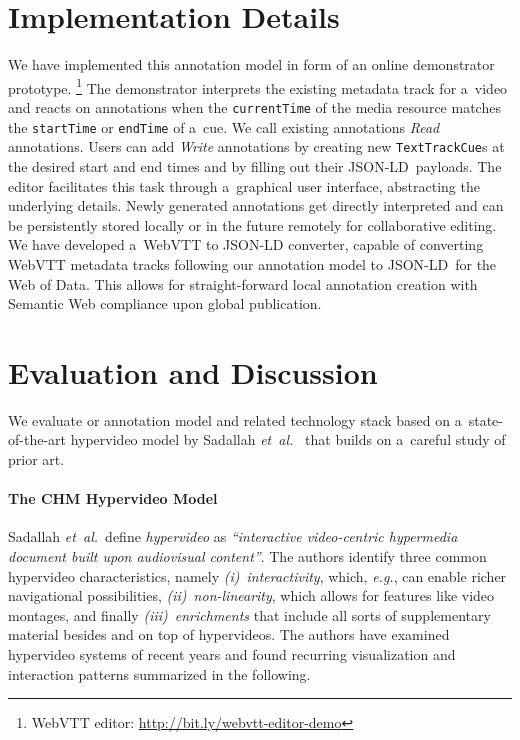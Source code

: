 \documentclass{sig-alternate}
\newcommand{\inlinelistingsize}{\fontsize{8pt}{11pt}}
\let\oldurl\url
\renewcommand{\url}[1]{\inlinelistingsize\oldurl{#1}}
\def\JSONLD{\mbox{JSON-LD}}
\begin{document}
\section{Implementation Details}

We have implemented this annotation model
in form of an online demonstrator prototype.%
\footnote{WebVTT editor: \url{http://bit.ly/webvtt-editor-demo}}
The demonstrator interprets the existing metadata track for a~video
and reacts on annotations when the \texttt{currentTime}
of the media resource matches the
\texttt{startTime} or \texttt{endTime} of a~cue.
We call existing annotations \emph{Read} annotations.
Users can add \emph{Write} annotations
by creating new \texttt{TextTrackCue}s
at the desired start and end times
and by filling out their \JSONLD~payloads.
The editor facilitates this task through a~graphical user interface, abstracting the underlying details.
Newly generated annotations get directly interpreted
and can be persistently stored locally
or in the future remotely for collaborative editing.
We have developed a~WebVTT to \JSONLD
converter, capable of converting WebVTT metadata tracks
following our annotation model
to \JSONLD~for the Web of Data.
This allows for straight-forward local annotation creation
with Semantic Web compliance upon global publication.

\section{Evaluation and Discussion}

We evaluate or annotation model and related technology stack
based on a~state-of-the-art hypervideo model by
Sadallah \emph{et~al.}~\cite{sadallah2012hypervideo}
that builds on a~careful study of prior art.

\paragraph{The CHM Hypervideo Model}

Sadallah \emph{et~al.}\ define
\emph{hypervideo} as \textit{``interactive video-cen\-tric
hypermedia document built upon audiovisual content''}.
The authors identify three common hypervideo characteristics,
namely \emph{(i)}~\emph{interactivity}, which, \emph{e.g.},
can enable richer navigational possibilities,
\emph{(ii)}~\emph{non-linearity}, which allows for features
like video montages, and finally \emph{(iii)}~\emph{enrichments}
that include all sorts of supplementary material besides
and on top of hypervideos.
The authors have examined hypervideo systems
of recent years and found
recurring visualization and interaction patterns
summarized in the following.\\
\end{document}
